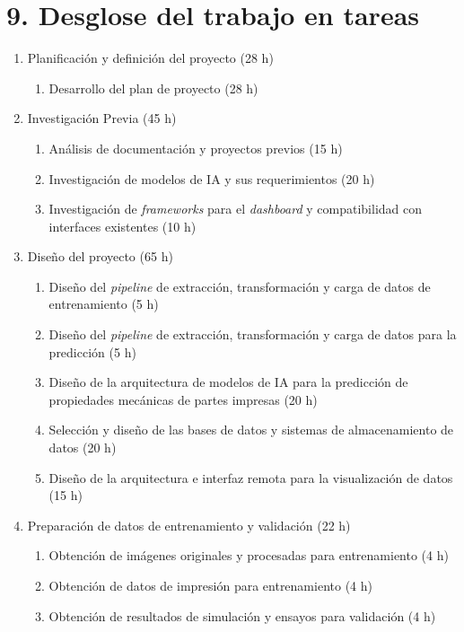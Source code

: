 \documentclass[
11pt, %
]{charter}
\begin{document}
\section{9. Desglose del trabajo en tareas}
\label{sec:wbs}

\begin{enumerate}
    \item Planificación y definición del proyecto (28 h)
    	\begin{enumerate}
        	\item Desarrollo del plan de proyecto (28 h)
    	\end{enumerate}
    \item Investigación Previa (45 h)
    	\begin{enumerate}
        	\item Análisis de documentación y proyectos previos (15 h)
        	\item Investigación de modelos de IA y sus requerimientos (20 h)
        	\item Investigación de \textit{frameworks} para el \textit{dashboard} y compatibilidad con interfaces existentes (10 h)
    	\end{enumerate}
    \item Diseño del proyecto (65 h)
    	\begin{enumerate}
        	\item Diseño del \textit{pipeline} de extracción, transformación y carga de datos de entrenamiento (5 h)
        	\item Diseño del \textit{pipeline} de extracción, transformación y carga de datos para la predicción (5 h)
        	\item Diseño de la arquitectura de modelos de IA para la predicción de propiedades mecánicas de partes impresas (20 h)
        	\item Selección y diseño de las bases de datos y sistemas de almacenamiento de datos (20 h)
        	\item Diseño de la arquitectura e interfaz remota para la visualización de datos (15 h)
    	\end{enumerate}
    \item Preparación de datos de entrenamiento y validación (22 h)
    \begin{enumerate}
        \item Obtención de imágenes originales y procesadas para entrenamiento (4 h)
        \item Obtención de datos de impresión para entrenamiento (4 h)
        \item Obtención de resultados de simulación y ensayos para validación (4 h)

\end{enumerate}
\end{enumerate}
\end{document}
